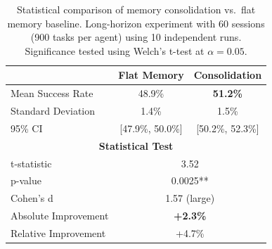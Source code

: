 \begin{table}[t]
\centering
\caption{Statistical comparison of memory consolidation vs.\ flat memory baseline.
Long-horizon experiment with 60 sessions (900 tasks per agent) using 10 independent runs.
Significance tested using Welch's t-test at $\alpha = 0.05$.}
\label{tab:statistical_results}
\begin{tabular}{@{}lcc@{}}
\toprule
& Flat Memory & Consolidation \\
\midrule
Mean Success Rate & 48.9\% & \textbf{51.2\%} \\
Standard Deviation & 1.4\% & 1.5\% \\
95\% CI & [47.9\%, 50.0\%] & [50.2\%, 52.3\%] \\
\midrule
\multicolumn{3}{c}{\textbf{Statistical Test}} \\
\midrule
t-statistic & \multicolumn{2}{c}{3.52} \\
p-value & \multicolumn{2}{c}{0.0025**} \\
Cohen's d & \multicolumn{2}{c}{1.57 (large)} \\
\midrule
Absolute Improvement & \multicolumn{2}{c}{\textbf{+2.3\%}} \\
Relative Improvement & \multicolumn{2}{c}{+4.7\%} \\
\bottomrule
\end{tabular}
\end{table}
